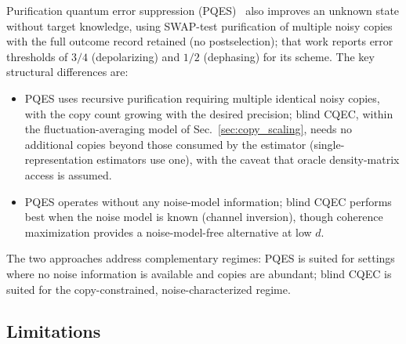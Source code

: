 \documentclass[12pt,a4paper]{article}
\begin{document}
Purification quantum error suppression (PQES)~\cite{Raghoonanan2026} also improves an unknown state without target knowledge, using SWAP-test purification of multiple noisy copies with the full outcome record retained (no postselection); that work reports error thresholds of $3/4$ (depolarizing) and $1/2$ (dephasing) for its scheme.
The key structural differences are:
\begin{itemize}
\item PQES uses recursive purification requiring multiple identical noisy copies, with the copy count growing with the desired precision;
blind CQEC, within the fluctuation-averaging model of Sec.~\ref{sec:copy_scaling}, needs no additional copies beyond those consumed by the estimator (single-representation estimators use one), with the caveat that oracle density-matrix access is assumed.
\item PQES operates without any noise-model information;
blind CQEC performs best when the noise model is known (channel inversion), though coherence maximization provides a noise-model-free alternative at low $d$.
\end{itemize}
The two approaches address complementary regimes: PQES is suited for settings where no noise information is available and copies are abundant; blind CQEC is suited for the copy-constrained, noise-characterized regime.


\subsection{Limitations}
\label{sec:limitations}
\end{document}
